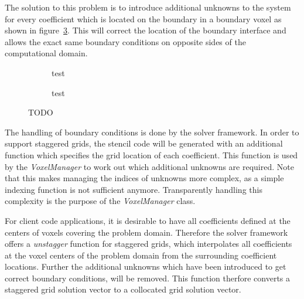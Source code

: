 The solution to this problem is to introduce additional unknowns to the system for every coefficient which is located on the boundary in a boundary voxel as shown in figure~\ref{fig:pn_staggered_grid_handled_bc}. This will correct the location of the boundary interface and allows the exact same boundary conditions on opposite sides of the computational domain.
\begin{figure}[h]
\centering
\begin{subfigure}{0.49\columnwidth}
\caption{test}
\label{fig:pn_staggering_correct_bc}
\end{subfigure}%
\hspace{0.01\columnwidth}
\begin{subfigure}{0.49\columnwidth}
\caption{test}
\label{fig:pn_staggering_correct_bc_checkerboard}
\end{subfigure}%
\caption{TODO}
\label{fig:pn_staggered_grid_handled_bc}
\end{figure}

The handling of boundary conditions is done by the solver framework. In order to support staggered grids, the stencil code will be generated with an additional function which specifies the grid location of each coefficient. This function is used by the \emph{VoxelManager} to work out which additional unknowns are required. Note that this makes managing the indices of unknowns more complex, as a simple indexing function is not sufficient anymore. Transparently handling this complexity is the purpose of the \emph{VoxelManager} class.

For client code applications, it is desirable to have all coefficients defined at the centers of voxels covering the problem domain. Therefore the solver framework offers a \emph{unstagger} function for staggered grids, which interpolates all coefficients at the voxel centers of the problem domain from the surrounding coefficient locations. Further the additional unknowns which have been introduced to get correct boundary conditions, will be removed. This function therfore converts a staggered grid solution vector to a collocated grid solution vector.

